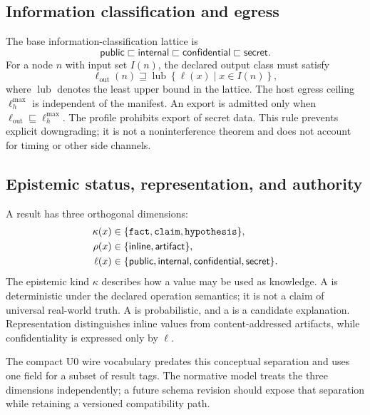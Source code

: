 \subsection{Information classification and egress}
The base information-classification lattice is
\begin{equation}
\textsf{public}\sqsubset\textsf{internal}\sqsubset\textsf{confidential}\sqsubset\textsf{secret}.
\end{equation}
For a node $n$ with input set $I(n)$, the declared output class must satisfy
\begin{equation}
\ell_{\mathrm{out}}(n)\sqsupseteq
\operatorname{lub}\!\left\{\ell(x)\mid x\in I(n)\right\},
\label{eq:classification}
\end{equation}
where $\operatorname{lub}$ denotes the least upper bound in the lattice. The host egress ceiling $\ell_h^{\max}$ is independent of the manifest. An export is admitted only when $\ell_{\mathrm{out}}\sqsubseteq \ell_h^{\max}$. The \Uzero profile prohibits export of \textsf{secret} data. This rule prevents explicit downgrading; it is not a noninterference theorem and does not account for timing or other side channels.

\subsection{Epistemic status, representation, and authority}
A result has three orthogonal dimensions:
\begin{align}
\kappa(x)&\in\{\texttt{fact}{},\texttt{claim}{},\texttt{hypothesis}{}\},\label{eq:epistemic-kind}\\
\rho(x)&\in\{\textsf{inline},\textsf{artifact}\},\\
\ell(x)&\in\{\textsf{public},\textsf{internal},\textsf{confidential},\textsf{secret}\}.
\end{align}
The epistemic kind $\kappa$ describes how a value may be used as knowledge. A \factkind{} is deterministic under the declared operation semantics; it is not a claim of universal real-world truth. A \claimkind{} is probabilistic, and a \hypkind{} is a candidate explanation. Representation distinguishes inline values from content-addressed artifacts, while confidentiality is expressed only by $\ell$.

The compact U0 wire vocabulary predates this conceptual separation and uses one field for a subset of result tags. The normative model treats the three dimensions independently; a future schema revision should expose that separation while retaining a versioned compatibility path.

